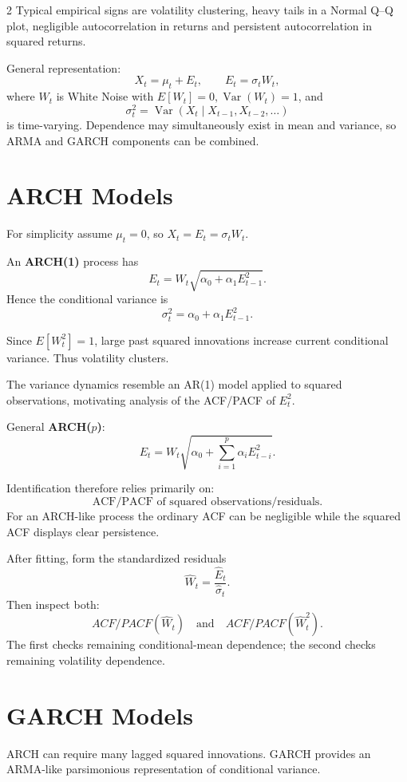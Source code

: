 \documentclass[9pt,a4paper]{extarticle}
\newcommand{\key}[1]{\textbf{#1}}
\begin{document}
\begin{multicols}{2}
Typical empirical signs are volatility clustering, heavy tails in a Normal Q--Q plot, negligible autocorrelation in returns and persistent autocorrelation in squared returns.

General representation:
\[
X_t=\mu_t+E_t,\qquad
E_t=\sigma_tW_t,
\]
where \(W_t\) is White Noise with \(E[W_t]=0,\operatorname{Var}(W_t)=1\), and
\[
\sigma_t^2=\operatorname{Var}(X_t\mid X_{t-1},X_{t-2},\ldots)
\]
is time-varying. Dependence may simultaneously exist in mean and variance, so ARMA and GARCH components can be combined.

\section{ARCH Models}

For simplicity assume \(\mu_t=0\), so \(X_t=E_t=\sigma_tW_t\).

An \key{ARCH(1)} process has
\[
\boxed{
E_t=W_t\sqrt{\alpha_0+\alpha_1E_{t-1}^2}.
}
\]
Hence the conditional variance is
\[
\boxed{
\sigma_t^2=\alpha_0+\alpha_1E_{t-1}^2.
}
\]

Since \(E[W_t^2]=1\), large past squared innovations increase current conditional variance. Thus volatility clusters.

The variance dynamics resemble an AR(1) model applied to squared observations, motivating analysis of the ACF/PACF of \(E_t^2\).

General \key{ARCH(\(p\))}:
\[
\boxed{
E_t=W_t
\sqrt{\alpha_0+\sum_{i=1}^{p}\alpha_iE_{t-i}^2}.
}
\]

Identification therefore relies primarily on:
\[
\boxed{\text{ACF/PACF of squared observations/residuals}.}
\]
For an ARCH-like process the ordinary ACF can be negligible while the squared ACF displays clear persistence.

After fitting, form the standardized residuals
\[
\widehat W_t=\frac{\widehat E_t}{\widehat\sigma_t}.
\]
Then inspect both:
\[
\boxed{
ACF/PACF(\widehat W_t)
\quad\text{and}\quad
ACF/PACF(\widehat W_t^2).
}
\]
The first checks remaining conditional-mean dependence; the second checks remaining volatility dependence.

\section{GARCH Models}

ARCH can require many lagged squared innovations. GARCH provides an ARMA-like parsimonious representation of conditional variance.


\end{multicols}
\end{document}
